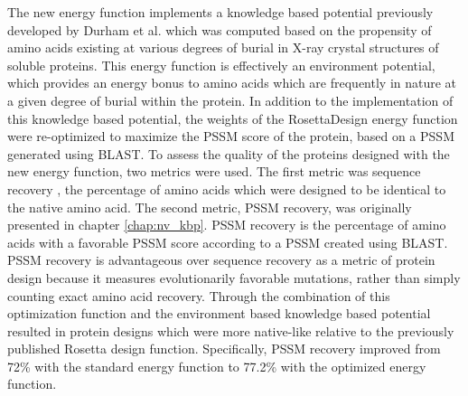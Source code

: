 The new energy function implements a knowledge based potential previously developed by Durham et al. \citep{Durham:2009kt} which was computed based on the propensity of amino acids existing at various degrees of burial in X-ray crystal structures of soluble proteins.
This energy function is effectively an environment potential, which provides an energy bonus to amino acids which are frequently in nature at a given degree of burial within the protein.
In addition to the implementation of this knowledge based potential, the weights of the RosettaDesign energy function were re-optimized to maximize the \ac{PSSM} score of the protein, based on a \ac{PSSM} generated using \ac{BLAST}.
To assess the quality of the proteins designed with the new energy function, two metrics were used.
The first metric was sequence recovery \citep{Kuhlman:2000tc}, the percentage of amino acids which were designed to be identical to the native amino acid.
The second metric, \ac{PSSM} recovery, was originally presented in chapter \ref{chap:nv_kbp}.
\ac{PSSM} recovery is the percentage of amino acids with a favorable \ac{PSSM} score according to a \ac{PSSM} created using \ac{BLAST}.
\ac{PSSM} recovery is advantageous over sequence recovery as a metric of protein design because it measures evolutionarily favorable mutations, rather than simply counting exact amino acid recovery.
Through the combination of this optimization function and the environment based knowledge based potential resulted in protein designs which were more native-like relative to the previously published Rosetta design function.
Specifically, \ac{PSSM} recovery improved from 72\% with the standard energy function to 77.2\% with the optimized energy function.


